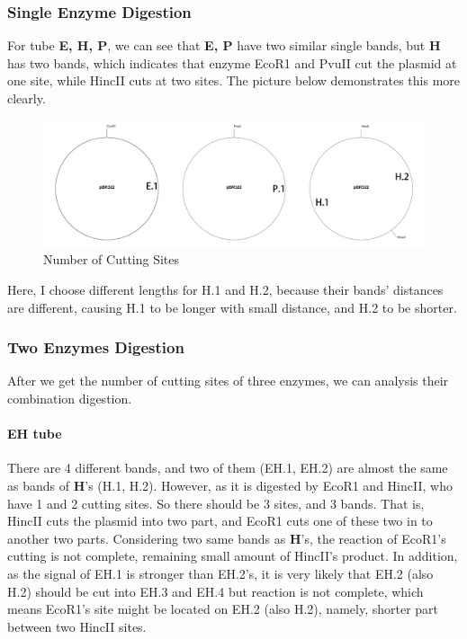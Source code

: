 \documentclass{article}
\begin{document}
            \subsubsection{Single Enzyme Digestion}
                For tube \textbf{E, H, P}, we can see that \textbf{E, P} have two similar single bands, but \textbf{H} has two bands, which indicates that enzyme EcoR1 and PvuII cut the plasmid at one site, while HincII cuts at two sites. The picture below demonstrates this more clearly.
                \begin{figure}[H]
                    \centering
                    \includegraphics[width = 0.9\linewidth]{../Data/Plasmid/single.png}
                    \caption{Number of Cutting Sites}
                    \label{single.cut}
                \end{figure}
                Here, I choose different lengths for H.1 and H.2, because their bands' distances are different, causing H.1 to be longer with small distance, and H.2 to be shorter.

            \subsubsection{Two Enzymes Digestion}
                After we get the number of cutting sites of three enzymes, we can analysis their combination digestion.

                \paragraph{\textbf{EH} tube} There are 4 different bands, and two of them (EH.1, EH.2) are almost the same as bands of \textbf{H}'s (H.1, H.2). However, as it is digested by EcoR1 and HincII, who have 1 and 2 cutting sites. So there should be 3 sites, and 3 bands. That is, HincII cuts the plasmid into two part, and EcoR1 cuts one of these two in to another two parts. Considering two same bands as \textbf{H}'s, the reaction of EcoR1's cutting is not complete, remaining small amount of HincII's product. In addition, as the signal of EH.1 is stronger than EH.2's, it is very likely that EH.2 (also H.2) should be cut into EH.3 and EH.4 but reaction is not complete, which means EcoR1's site might be located on EH.2 (also H.2), namely, shorter part between two HincII sites.
\end{document}
